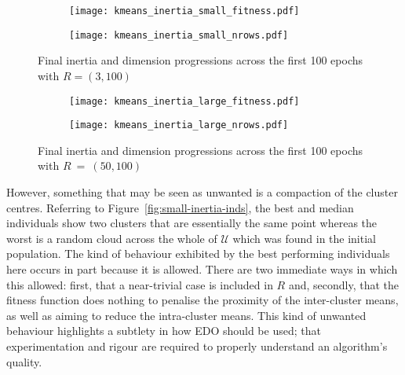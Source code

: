 \begin{figure}[htbp]
    \centering
    \begin{subfigure}{\imgwidth}
        \texttt{[image: kmeans\_inertia\_small\_fitness.pdf]}
        \label{fig:kmeans_inertia_small_fitness}
    \end{subfigure}

    \begin{subfigure}{\imgwidth}
        \texttt{[image: kmeans\_inertia\_small\_nrows.pdf]}
        \label{fig:kmeans_inertia_small_nrows}
    \end{subfigure}
    \caption{%
        Final inertia and dimension progressions across the first 100 epochs
        with \(R=(3,100)\)
    }\label{fig:small-inertia-50}
\end{figure}

\begin{figure}[htbp]
    \centering
    \begin{subfigure}{\imgwidth}
        \texttt{[image: kmeans\_inertia\_large\_fitness.pdf]}
        \label{fig:kmeans_inertia_large_fitness}
    \end{subfigure}

    \begin{subfigure}{\imgwidth}
        \texttt{[image: kmeans\_inertia\_large\_nrows.pdf]}
        \label{fig:kmeans_inertia_large_nrows}
    \end{subfigure}
    \caption{%
        Final inertia and dimension progressions across the first 100 epochs
        with \(R~=~(50,100)\)
    }\label{fig:large-inertia-50}
\end{figure}

However, something that may be seen as unwanted is a compaction of the cluster
centres. Referring to Figure~\ref{fig:small-inertia-inds}, the best and median
individuals show two clusters that are essentially the same point whereas the
worst is a random cloud across the whole of \(\mathcal{U}\) which was found in
the initial population. The kind of behaviour exhibited by the best performing
individuals here occurs in part because it is allowed. There are two immediate
ways in which this allowed: first, that a near-trivial case is included in \(R\)
and, secondly, that the fitness function does nothing to penalise the proximity
of the inter-cluster means, as well as aiming to reduce the intra-cluster means.
This kind of unwanted behaviour highlights a subtlety in how EDO should be used;
that experimentation and rigour are required to properly understand an
algorithm's quality.

